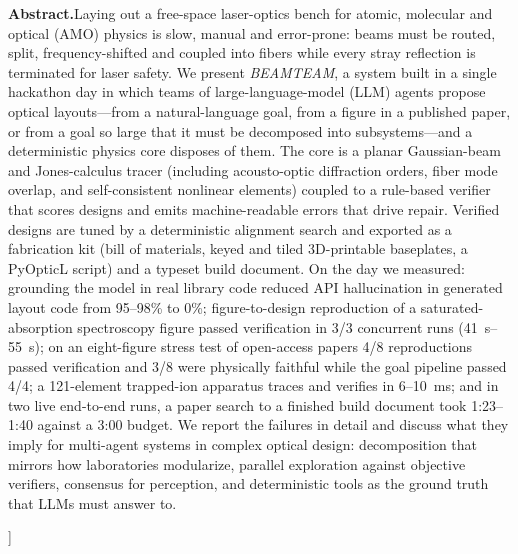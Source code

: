 \documentclass[10pt,twocolumn,letterpaper]{article}
\begin{document}
{\begin{center}
\begin{minipage}{0.9\textwidth}
      \noindent\textbf{Abstract.}\enspace Laying out a free-space laser-optics bench for atomic, molecular and optical (AMO) physics is slow, manual and error-prone: beams must be routed, split, frequency-shifted and coupled into fibers while every stray reflection is terminated for laser safety. We present \emph{BEAMTEAM}, a system built in a single hackathon day in which teams of large-language-model (LLM) agents propose optical layouts---from a natural-language goal, from a figure in a published paper, or from a goal so large that it must be decomposed into subsystems---and a deterministic physics core disposes of them. The core is a planar Gaussian-beam and Jones-calculus tracer (including acousto-optic diffraction orders, fiber mode overlap, and self-consistent nonlinear elements) coupled to a rule-based verifier that scores designs and emits machine-readable errors that drive repair. Verified designs are tuned by a deterministic alignment search and exported as a fabrication kit (bill of materials, keyed and tiled 3D-printable baseplates, a PyOpticL script) and a typeset build document. On the day we measured: grounding the model in real library code reduced API hallucination in generated layout code from 95--98\% to 0\%; figure-to-design reproduction of a saturated-absorption spectroscopy figure passed verification in 3/3 concurrent runs (\SIrange{41}{55}{\second}); on an eight-figure stress test of open-access papers 4/8 reproductions passed verification and 3/8 were physically faithful while the goal pipeline passed 4/4; a 121-element trapped-ion apparatus traces and verifies in 6--\SI{10}{\milli\second}; and in two live end-to-end runs, a paper search to a finished build document took 1:23--1:40 against a 3:00 budget. We report the failures in detail and discuss what they imply for multi-agent systems in complex optical design: decomposition that mirrors how laboratories modularize, parallel exploration against objective verifiers, consensus for perception, and deterministic tools as the ground truth that LLMs must answer to.
    \end{minipage}
  \end{center}
  \vspace{0.9em}
}]


\end{document}
